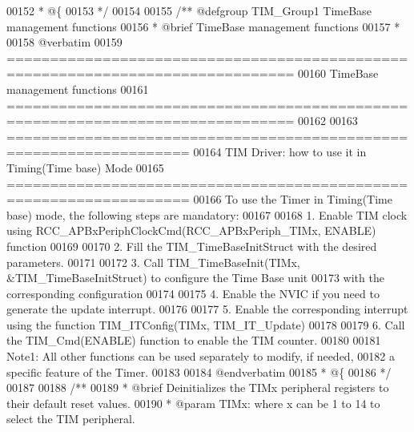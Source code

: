 \begin{DoxyCode}
00152 \textcolor{comment}{  * @\{}
00153 \textcolor{comment}{  */}
00154 
00155 \textcolor{comment}{/** @defgroup TIM\_Group1 TimeBase management functions}
00156 \textcolor{comment}{ *  @brief   TimeBase management functions }
00157 \textcolor{comment}{ *}
00158 \textcolor{comment}{@verbatim   }
00159 \textcolor{comment}{ ===============================================================================}
00160 \textcolor{comment}{                       TimeBase management functions}
00161 \textcolor{comment}{ ===============================================================================  }
00162 \textcolor{comment}{  }
00163 \textcolor{comment}{       ===================================================================      }
00164 \textcolor{comment}{              TIM Driver: how to use it in Timing(Time base) Mode}
00165 \textcolor{comment}{       =================================================================== }
00166 \textcolor{comment}{       To use the Timer in Timing(Time base) mode, the following steps are mandatory:}
00167 \textcolor{comment}{       }
00168 \textcolor{comment}{       1. Enable TIM clock using RCC\_APBxPeriphClockCmd(RCC\_APBxPeriph\_TIMx, ENABLE) function}
00169 \textcolor{comment}{                    }
00170 \textcolor{comment}{       2. Fill the TIM\_TimeBaseInitStruct with the desired parameters.}
00171 \textcolor{comment}{       }
00172 \textcolor{comment}{       3. Call TIM\_TimeBaseInit(TIMx, &TIM\_TimeBaseInitStruct) to configure the Time Base unit}
00173 \textcolor{comment}{          with the corresponding configuration}
00174 \textcolor{comment}{          }
00175 \textcolor{comment}{       4. Enable the NVIC if you need to generate the update interrupt. }
00176 \textcolor{comment}{          }
00177 \textcolor{comment}{       5. Enable the corresponding interrupt using the function TIM\_ITConfig(TIMx, TIM\_IT\_Update) }
00178 \textcolor{comment}{       }
00179 \textcolor{comment}{       6. Call the TIM\_Cmd(ENABLE) function to enable the TIM counter.}
00180 \textcolor{comment}{             }
00181 \textcolor{comment}{       Note1: All other functions can be used separately to modify, if needed,}
00182 \textcolor{comment}{          a specific feature of the Timer. }
00183 \textcolor{comment}{}
00184 \textcolor{comment}{@endverbatim}
00185 \textcolor{comment}{  * @\{}
00186 \textcolor{comment}{  */}
00187 
00188 \textcolor{comment}{/**}
00189 \textcolor{comment}{  * @brief  Deinitializes the TIMx peripheral registers to their default reset values.}
00190 \textcolor{comment}{  * @param  TIMx: where x can be 1 to 14 to select the TIM peripheral.}

\end{DoxyCode}
